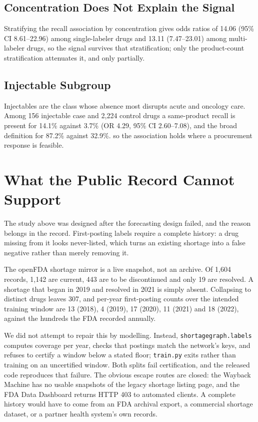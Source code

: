 \documentclass[conference,letterpaper]{IEEEtran}
\begin{document}
\subsection{Concentration Does Not Explain the Signal}
Stratifying the recall association by concentration gives odds ratios of 14.06
(95\% CI 8.61--22.96) among single-labeler drugs and 13.11 (7.47--23.01) among
multi-labeler drugs, so the signal survives that stratification; only the
product-count stratification attenuates it, and only partially.

\subsection{Injectable Subgroup}
Injectables are the class whose absence most disrupts acute and oncology care.
Among 156 injectable case and 2{,}224 control drugs a same-product recall is
present for 14.1\% against 3.7\% (OR 4.29, 95\% CI 2.60--7.08), and the broad
definition for 87.2\% against 32.9\%. so the association holds where a procurement response is feasible.

\section{What the Public Record Cannot Support}\label{sec:audit}

The study above was designed after the forecasting design failed, and the reason
belongs in the record. First-posting labels require a complete history: a drug
missing from it looks never-listed, which turns an existing shortage into a false
negative rather than merely removing it.

The openFDA shortage mirror is a live snapshot, not an archive. Of 1{,}604
records, 1{,}142 are current, 443 are to be discontinued and only 19 are
resolved. A shortage that began in 2019 and resolved in 2021 is simply absent.
Collapsing to distinct drugs leaves 307, and per-year first-posting counts over
the intended training window are 13 (2018), 4 (2019), 17 (2020), 11 (2021) and
18 (2022), against the hundreds the FDA recorded annually.

We did not attempt to repair this by modelling. Instead,
\texttt{shortagegraph.labels} computes coverage per year, checks that postings
match the network's keys, and refuses to certify a window below a stated floor;
\texttt{train.py} exits rather than training on an uncertified window. Both
splits fail certification, and the released code reproduces that failure. The
obvious escape routes are closed: the Wayback Machine has no usable snapshots of
the legacy shortage listing page, and the FDA Data Dashboard returns HTTP 403 to
automated clients. A complete history would have to come from an FDA archival
export, a commercial shortage dataset, or a partner health system's own records.
\end{document}

